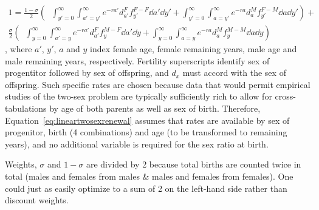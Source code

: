 \begin{equation}
\label{eq:lineartwosexrenewal}
\begin{split}
1 = \frac{1 - \sigma}{2} \left(\;\;
            \int _{y'=0}^\infty \int _{a'=y'}^\infty e^{-ra'}
                      d_{a'}^F f_{y'}^{F-F} \dd a' \dd y' + 
            \int _{y'=0}^\infty \int _{a=y'}^\infty e^{-ra}
                      d_{a}^M f_{y'}^{F-M} \dd a \dd y'\right) + \\ 
     \frac{\sigma}{2} \left(\;\;
            \int _{y=0}^\infty \int _{a'=y}^\infty e^{-ra'}
                      d_{a'}^F f_{y}^{M-F} \dd a' \dd y + 
            \int _{y=0}^\infty \int _{a=y}^\infty e^{-ra}
                      d_{a}^M f_{y}^{M-M} \dd a \dd y \right)
\end{split}
\end{equation}
, where $a'$, $y'$, $a$ and $y$ index female age, female remaining years, male
age and male remaining years, respectively. Fertility superscripts identify sex of
progentitor followed by sex of offspring, and $d_x$ must accord with the sex of
offspring. Such specific rates are chosen because data that would permit
empirical studies of the two-sex problem are typically sufficiently rich to allow 
for cross-tabulations by age of both parents as well as sex of birth. 
Therefore, Equation~\eqref{eq:lineartwosexrenewal} assumes that rates are
available by sex of progenitor, birth (4 combinations) and age (to be transformed to remaining years), 
and no additional variable is required for the sex ratio at birth. 

Weights, $\sigma$ and $1-\sigma$ are divided by 2 because
total births are counted twice in total (males and females from males \&
males and females from females). One could just as easily optimize to a sum of
2 on the left-hand side rather than discount weights.

